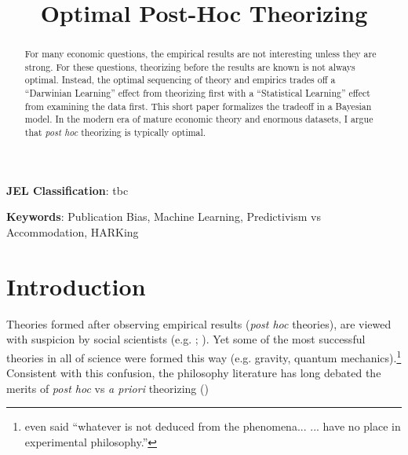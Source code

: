 \documentclass[12pt,english]{article}
\theoremstyle{plain}
\theoremstyle{plain}
\begin{document}
\title{Optimal Post-Hoc Theorizing}

\newif\ifanon
\anontrue

\ifanon
    \author{}
    \date{}
\else
    \author{{Andrew Y. Chen}\\
    {\normalsize Federal Reserve Board}}
    \date{May 2025\thanks{email:andrew.y.chen@frb.gov. I thank Irene Caracioni for excellent research assistance, and Alejandro Lopez-Lira, Matt Ringgenberg, and Tom Zimmermann for helpful comments. The views expressed herein are those of the authors and do not necessarily reflect the position of the Board of Governors of the Federal Reserve or the Federal Reserve System.}}
\fi

\maketitle

 
\begin{abstract}
\begin{singlespace}
\noindent For many economic questions, the empirical results are not interesting unless they are strong. For these questions, theorizing before the results are known is not always optimal. Instead, the optimal sequencing of theory and empirics trades off a ``Darwinian Learning'' effect from theorizing first with a ``Statistical Learning'' effect from examining the data first. This short paper formalizes the tradeoff in a Bayesian model. In the modern era of mature economic theory and enormous datasets, I argue that \emph{post hoc} theorizing is typically optimal.
\end{singlespace}
\end{abstract}
\vspace{10ex}
 \textbf{\color{Black}JEL Classification}: tbc

\noindent\textbf{\color{Black}Keywords}: Publication Bias, Machine Learning,  Predictivism vs Accommodation, HARKing
\thispagestyle{empty}\setcounter{page}{0}

\vspace{10ex}

\pagebreak{}

\section{Introduction}

\setcounter{page}{1}

Theories formed after observing empirical results (\emph{post hoc} theories), are viewed with suspicion by social scientists (e.g. \citet{kerr1998harking}; \citet{harvey2017presidential}). Yet some of the most successful theories in all of science were formed this way (e.g. gravity, quantum mechanics).\footnote{\citet{newton1726scholium} even said ``whatever is not deduced from the phenomena... ... have no place in experimental philosophy.''} Consistent with this confusion, the philosophy literature has long debated the merits of \emph{post hoc} vs \emph{a priori} theorizing (\citet{barnes2022prediction})
\end{document}
